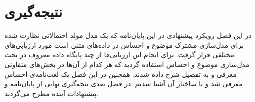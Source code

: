 \section{نتیجه‌گیری}
در این فصل رویکرد پیشنهادی در این پایان‌‌نامه که یک مدل مولد احتمالاتی نظارت شده برای مدل‌سازی مشترک موضوع و احساس در داده‌های متنی است مورد ارزیابی‌های مختلفی‌ قرار گرفت.  برای انجام این ارزیابی‌ها از چند پایگاه داده معروف در بحث مدل‌سازی موضوع و احساس استفاده گردید که هر کدام از آن‌ها در بخش‌های متفاوتی معرفی‌ و به تفصیل شرح داده شدند. همچنین در این فصل یک لغت‌نامه‌ی احساس معرفی‌ شد و با ساختار آن آشنا شدیم. در فصل بعدی نتجه‌گیری نهایی از پایان‌‌نامه و پیشنهادات آینده مطرح می‌گردند.
%
%
